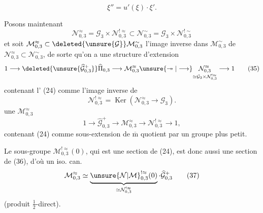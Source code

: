 
\[
\xi''=u'(\xi)\cdot\xi'.
\tag{33}
\]

Posons maintenant
\[
\mathcal N_{0,3}^{\approx}
=\mathcal G_3\times\mathcal N_{0,3}^{!\approx}
\subset\mathcal N_{0,3}^{\sim}
=\mathcal G_3\times\mathcal N_{0,3}^{!\sim}
\tag{34}
\]
et soit $\mathcal M_{0,3}^{\approx}\subset\deleted{\unsure{\mathcal G}}\mathcal M_{0,3}^{\sim}$ l'image inverse dans $\mathcal M_{0,3}^{\sim}$ de $\mathcal N_{0,3}^{\approx}\subset\mathcal N_{0,3}^{\sim}$, de sorte qu'on a une structure d'extension
\[
1\longrightarrow\deleted{\unsure{\widehat{\mathcal G}_{0,3}^{+}}}\widehat\Pi_{0,3}
\longrightarrow\mathcal M_{0,3}^{\approx}
\unsure{\twoheadrightarrow|\longrightarrow}
\underset{\simeq\mathcal G_3\times\mathcal N_{0,3}^{!\approx}}{\mathcal N_{0,3}^{\approx}}
\longrightarrow1
\tag{35}
\]
contenant l' (24) comme l'image inverse de 
\[
\mathcal N_{0,3}^{!\approx}
=\operatorname{Ker}(\mathcal N_{0,3}^{\approx}\longrightarrow\mathcal G_3).
\]
   une   $\mathcal M_{0,3}^{\approx}$
\[
1\longrightarrow\widehat{\mathcal G}_{0,3}^{+}
\longrightarrow\mathcal M_{0,3}^{\approx}
\longrightarrow\mathcal N_{0,3}^{!\approx}\longrightarrow1,
\tag{36}
\]
contenant (24) comme sous-extension de $\overline{\mathrm m}$ quotient par un groupe plus petit.

Le sous-groupe $\mathcal M_{0,3}^{!\approx}(0)$, qui est une section de (24), est donc aussi une section de (36), d'où un iso. can.
\[
\mathcal M_{0,3}^{\approx}
\simeq\underbrace{\unsure{\mathcal N|\mathcal M}_{0,3}^{!\approx}(0)}_{\simeq\mathcal N_{0,3}^{!\approx}}
\cdot\widehat{\mathcal G}_{0,3}^{+}
\tag{37}
\]
(produit $\frac12$-direct).


